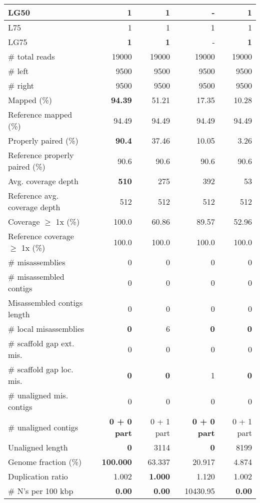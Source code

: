 \documentclass[12pt,a4paper]{article}
\begin{document}
\begin{table}[ht]
\begin{center}
\begin{tabular}{|l*{4}{|r}|}
LG50 & {\bf 1} & {\bf 1} & - & {\bf 1} \\ \hline
L75 & 1 & 1 & 1 & 1 \\ \hline
LG75 & {\bf 1} & {\bf 1} & - & {\bf 1} \\ \hline
\# total reads & 19000 & 19000 & 19000 & 19000 \\ \hline
\# left & 9500 & 9500 & 9500 & 9500 \\ \hline
\# right & 9500 & 9500 & 9500 & 9500 \\ \hline
Mapped (\%) & {\bf 94.39} & 51.21 & 17.35 & 10.28 \\ \hline
Reference mapped (\%) & 94.49 & 94.49 & 94.49 & 94.49 \\ \hline
Properly paired (\%) & {\bf 90.4} & 37.46 & 10.05 & 3.26 \\ \hline
Reference properly paired (\%) & 90.6 & 90.6 & 90.6 & 90.6 \\ \hline
Avg. coverage depth & {\bf 510} & 275 & 392 & 53 \\ \hline
Reference avg. coverage depth & 512 & 512 & 512 & 512 \\ \hline
Coverage $\geq$ 1x (\%) & 100.0 & 60.86 & 89.57 & 52.96 \\ \hline
Reference coverage $\geq$ 1x (\%) & 100.0 & 100.0 & 100.0 & 100.0 \\ \hline
\# misassemblies & 0 & 0 & 0 & 0 \\ \hline
\# misassembled contigs & 0 & 0 & 0 & 0 \\ \hline
Misassembled contigs length & 0 & 0 & 0 & 0 \\ \hline
\# local misassemblies & {\bf 0} & 6 & {\bf 0} & {\bf 0} \\ \hline
\# scaffold gap ext. mis. & 0 & 0 & 0 & 0 \\ \hline
\# scaffold gap loc. mis. & {\bf 0} & {\bf 0} & 1 & {\bf 0} \\ \hline
\# unaligned mis. contigs & 0 & 0 & 0 & 0 \\ \hline
\# unaligned contigs & {\bf 0 + 0 part} & 0 + 1 part & {\bf 0 + 0 part} & 0 + 1 part \\ \hline
Unaligned length & {\bf 0} & 3114 & {\bf 0} & 8199 \\ \hline
Genome fraction (\%) & {\bf 100.000} & 63.337 & 20.917 & 4.874 \\ \hline
Duplication ratio & 1.002 & {\bf 1.000} & 1.120 & 1.002 \\ \hline
\# N's per 100 kbp & {\bf 0.00} & {\bf 0.00} & 10430.95 & {\bf 0.00} \\ \hline

\end{tabular}
\end{center}
\end{table}
\end{document}
